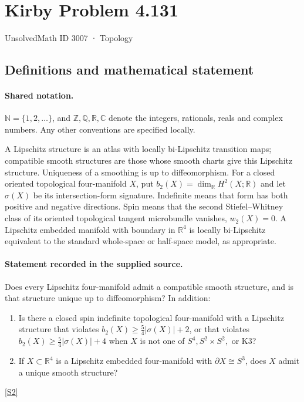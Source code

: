 \documentclass[11pt]{article}
\newcommand{\sref}[2]{\hyperlink{source:#1:#2}{[S#2]}}
\begin{document}
\setcounter{section}{3006}
\section{Kirby Problem 4.131}\label{3007}
{\small\sffamily UnsolvedMath ID 3007 · Topology}
\subsection{Definitions and mathematical statement}

\paragraph{Shared notation.}$\mathbb N=\{1,2,\ldots\}$, and $\mathbb Z,\mathbb Q,\mathbb R,\mathbb C$ denote the integers, rationals, reals and complex numbers. Any other conventions are specified locally.


A Lipschitz structure is an atlas with locally bi-Lipschitz transition maps; compatible smooth structures are those whose smooth charts give this Lipschitz structure. Uniqueness of a smoothing is up to diffeomorphism. For a closed oriented topological four-manifold $X$, put $b_2(X)=\dim_{\mathbb R}H^2(X;\mathbb R)$ and let $\sigma(X)$ be its intersection-form signature. Indefinite means that form has both positive and negative directions. Spin means that the second Stiefel--Whitney class of its oriented topological tangent microbundle vanishes, $w_2(X)=0$. A Lipschitz embedded manifold with boundary in $\mathbb R^4$ is locally bi-Lipschitz equivalent to the standard whole-space or half-space model, as appropriate.
\paragraph{Statement recorded in the supplied source.}
Does every Lipschitz four-manifold admit a compatible smooth structure, and is that structure unique up to diffeomorphism? In addition:
\begin{enumerate}
\item[(a)] Is there a closed spin indefinite topological four-manifold with a Lipschitz structure that violates
$b_2(X)\geq\tfrac54|\sigma(X)|+2$, or that violates
$b_2(X)\geq\tfrac54|\sigma(X)|+4$ when $X$ is not one of $S^4,S^2\times S^2,$ or K3?
\item[(b)] If $X\subset\mathbb R^4$ is a Lipschitz embedded four-manifold with $\partial X\cong S^3$, does $X$ admit a unique smooth structure?
\end{enumerate} \sref{3007}{2}
\end{document}
